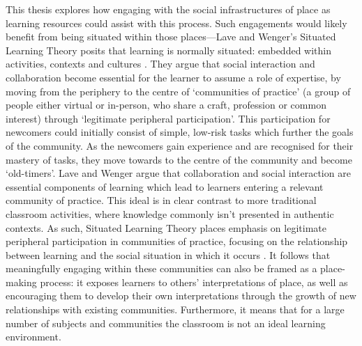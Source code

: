This thesis explores how engaging with the social infrastructures of place as learning resources could assist with this process. Such engagements would likely benefit from being situated within those places---Lave and Wenger's Situated Learning Theory posits that learning is normally situated: embedded within activities, contexts and cultures \citep{lave1991situated}. They argue that social interaction and collaboration become essential for the learner to assume a role of expertise, by moving from the periphery to the centre of `communities of practice' (a group of people either virtual or in-person, who share a craft, profession or common interest) through `legitimate peripheral participation'. This participation for newcomers could initially consist of simple, low-risk tasks which further the goals of the community. As the newcomers gain experience and are recognised for their mastery of tasks, they move towards to the centre of the community and become `old-timers'. Lave and Wenger argue that collaboration and social interaction are essential components of learning which lead to learners entering a relevant community of practice. This ideal is in clear contrast to more traditional classroom activities, where knowledge commonly isn't presented in authentic contexts. As such, Situated Learning Theory places emphasis on legitimate peripheral participation in communities of practice, focusing on the relationship between learning and the social situation in which it occurs \citep{lave1991situated}. It follows that meaningfully engaging within these communities can also be framed as a place-making process: it exposes learners to others' interpretations of place, as well as encouraging them to develop their own interpretations through the growth of new relationships with existing communities. Furthermore, it means that for a large number of subjects and communities the classroom is not an ideal learning environment. 

